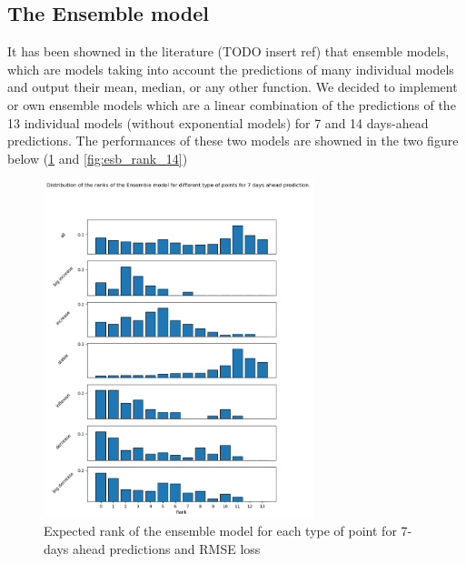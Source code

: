 \subsection{The Ensemble model}

It has been showned in the literature (TODO insert ref) that ensemble models, which are models taking into account the predictions of many individual models and output their mean, median, or any other function. 
We decided to implement or own ensemble models which are a linear combination of the predictions of the 13 individual models (without exponential models) for 7 and 14 days-ahead predictions.
The performances of these two models are showned in the two figure below (\ref{fig:esb_rank_7} and \ref{fig:esb_rank_14})

\begin{figure}
    \centering
    \includegraphics[width=0.7\textwidth]{figures/esb_rank_7.png}
    \caption{Expected rank of the ensemble model for each type of point for 7-days ahead predictions and RMSE loss}
    \label{fig:esb_rank_7}
\end{figure}


